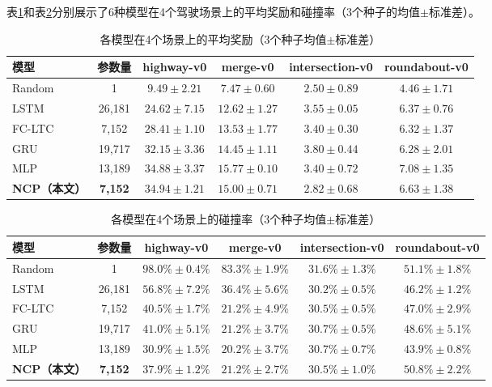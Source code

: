 \xiaosi

表\ref{tab:main_reward}和表\ref{tab:main_collision}分别展示了6种模型在4个驾驶场景上的平均奖励和碰撞率（3个种子的均值$\pm$标准差）。

\begin{table}[H]
  \centering
  \caption{各模型在4个场景上的平均奖励（3个种子均值$\pm$标准差）}
  \label{tab:main_reward}
  \wuhao
  \begin{tabular}{lccccc}
    \hline
    模型 & 参数量 & highway-v0 & merge-v0 & intersection-v0 & roundabout-v0 \\
    \hline
    Random   & 1       & $9.49\pm2.21$  & $7.47\pm0.60$  & $2.50\pm0.89$ & $4.46\pm1.71$ \\
    LSTM     & 26,181  & $24.62\pm7.15$ & $12.62\pm1.27$ & $3.55\pm0.05$ & $6.37\pm0.76$ \\
    FC-LTC   & 7,152   & $28.41\pm1.10$ & $13.53\pm1.77$ & $3.40\pm0.30$ & $6.32\pm1.37$ \\
    GRU      & 19,717  & $32.15\pm3.36$ & $14.45\pm1.11$ & $3.80\pm0.44$ & $6.28\pm2.01$ \\
    MLP      & 13,189  & $34.88\pm3.37$ & $\mathbf{15.77\pm0.10}$ & $3.40\pm0.72$ & $\mathbf{7.08\pm1.35}$ \\
    \textbf{NCP（本文）} & \textbf{7,152} & $\mathbf{34.94\pm1.21}$ & $15.00\pm0.71$ & $2.82\pm0.68$ & $6.63\pm1.38$ \\
    \hline
  \end{tabular}
\end{table}

\begin{table}[H]
  \centering
  \caption{各模型在4个场景上的碰撞率（3个种子均值$\pm$标准差）}
  \label{tab:main_collision}
  \wuhao
  \begin{tabular}{lccccc}
    \hline
    模型 & 参数量 & highway-v0 & merge-v0 & intersection-v0 & roundabout-v0 \\
    \hline
    Random   & 1       & $98.0\%\pm0.4\%$ & $83.3\%\pm1.9\%$ & $31.6\%\pm1.3\%$ & $51.1\%\pm1.8\%$ \\
    LSTM     & 26,181  & $56.8\%\pm7.2\%$ & $36.4\%\pm5.6\%$ & $30.2\%\pm0.5\%$ & $46.2\%\pm1.2\%$ \\
    FC-LTC   & 7,152   & $40.5\%\pm1.7\%$ & $21.2\%\pm4.9\%$ & $30.5\%\pm0.5\%$ & $47.0\%\pm2.9\%$ \\
    GRU      & 19,717  & $41.0\%\pm5.1\%$ & $21.2\%\pm3.7\%$ & $30.7\%\pm0.5\%$ & $48.6\%\pm5.1\%$ \\
    MLP      & 13,189  & $\mathbf{30.9\%\pm1.5\%}$ & $\mathbf{20.2\%\pm3.7\%}$ & $30.7\%\pm0.7\%$ & $\mathbf{43.9\%\pm0.8\%}$ \\
    \textbf{NCP（本文）} & \textbf{7,152} & $37.9\%\pm1.2\%$ & $21.2\%\pm2.7\%$ & $30.5\%\pm1.0\%$ & $50.8\%\pm2.2\%$ \\
    \hline
  \end{tabular}
\end{table}

